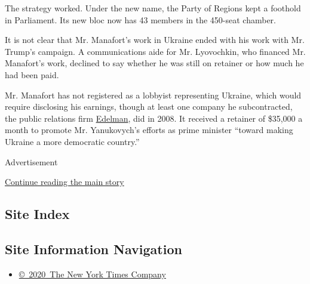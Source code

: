 The strategy worked. Under the new name, the Party of Regions kept a
foothold in Parliament. Its new bloc now has 43 members in the 450-seat
chamber.

It is not clear that Mr. Manafort's work in Ukraine ended with his work
with Mr. Trump's campaign. A communications aide for Mr. Lyovochkin, who
financed Mr. Manafort's work, declined to say whether he was still on
retainer or how much he had been paid.

Mr. Manafort has not registered as a lobbyist representing Ukraine,
which would require disclosing his earnings, though at least one company
he subcontracted, the public relations firm
\href{https://www.fara.gov/docs/3657-Exhibit-AB-20080725-6.pdf}{Edelman},
did in 2008. It received a retainer of \$35,000 a month to promote Mr.
Yanukovych's efforts as prime minister ``toward making Ukraine a more
democratic country.''

Advertisement

\protect\hyperlink{after-bottom}{Continue reading the main story}

\hypertarget{site-index}{%
\subsection{Site Index}\label{site-index}}

\hypertarget{site-information-navigation}{%
\subsection{Site Information
Navigation}\label{site-information-navigation}}

\begin{itemize}
\tightlist
\item
  \href{https://help.nytimes.com/hc/en-us/articles/115014792127-Copyright-notice}{©~2020~The
  New York Times Company}
\end{itemize}

